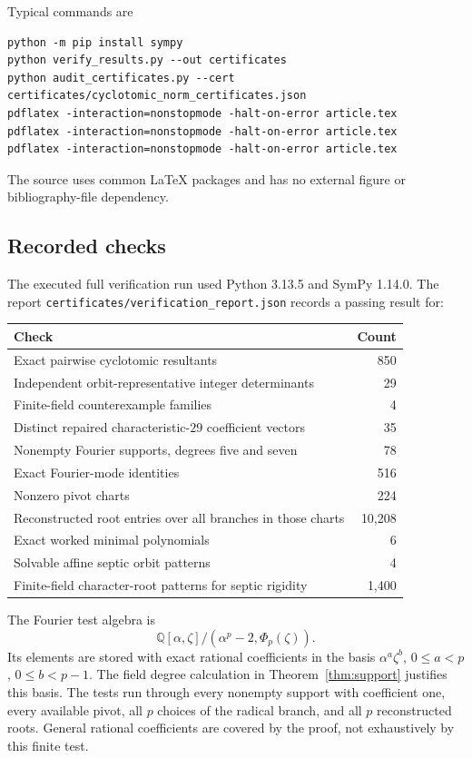 \documentclass[11pt,a4paper]{article}
\theoremstyle{definition}
\theoremstyle{remark}
\newcommand{\Q}{\mathbb Q}
\newcommand{\code}[1]{{\small\nolinkurl{#1}}}
\begin{document}
Typical commands are
\begin{lstlisting}
python -m pip install sympy
python verify_results.py --out certificates
python audit_certificates.py --cert certificates/cyclotomic_norm_certificates.json
pdflatex -interaction=nonstopmode -halt-on-error article.tex
pdflatex -interaction=nonstopmode -halt-on-error article.tex
pdflatex -interaction=nonstopmode -halt-on-error article.tex
\end{lstlisting}
The source uses common LaTeX packages and has no external figure or
bibliography-file dependency.

\subsection{Recorded checks}

The executed full verification run used Python 3.13.5 and SymPy 1.14.0.
The report \code{certificates/verification_report.json} records a passing
result for:
\begin{center}
\begin{tabular}{@{}lr@{}}
\toprule
Check & Count\\
\midrule
Exact pairwise cyclotomic resultants & 850\\
Independent orbit-representative integer determinants & 29\\
Finite-field counterexample families & 4\\
Distinct repaired characteristic-$29$ coefficient vectors & 35\\
Nonempty Fourier supports, degrees five and seven & 78\\
Exact Fourier-mode identities & 516\\
Nonzero pivot charts & 224\\
Reconstructed root entries over all branches in those charts & 10,208\\
Exact worked minimal polynomials & 6\\
Solvable affine septic orbit patterns & 4\\
Finite-field character-root patterns for septic rigidity & 1,400\\
\bottomrule
\end{tabular}
\end{center}

The Fourier test algebra is
\[
 \Q[\alpha,\zeta]/(\alpha^p-2,\Phi_p(\zeta)).
\]
Its elements are stored with exact rational coefficients in the basis
$\alpha^a\zeta^b$, $0\leq a<p$, $0\leq b<p-1$.
The field degree calculation in Theorem~\ref{thm:support} justifies this
basis. The tests run through every nonempty support with coefficient one,
every available pivot, all $p$ choices of the radical branch, and all $p$
reconstructed roots. General rational coefficients are covered by the
proof, not exhaustively by this finite test.
\end{document}
